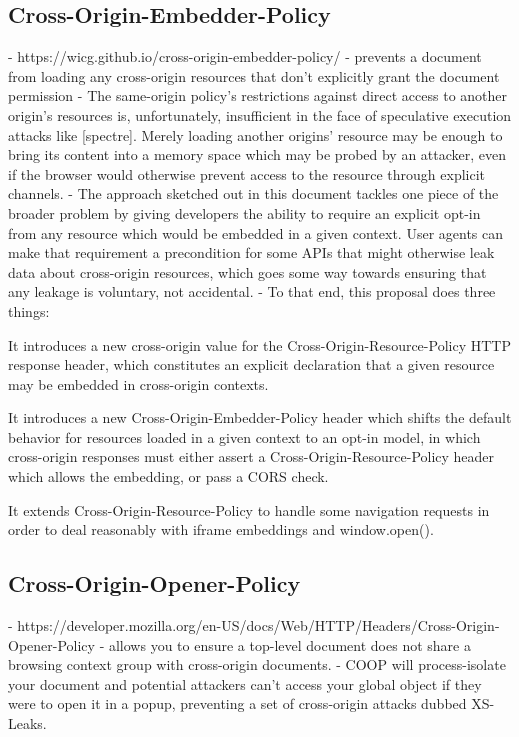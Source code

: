 \documentclass{mscreport}
\begin{document}
\subsection{Cross-Origin-Embedder-Policy}
- https://wicg.github.io/cross-origin-embedder-policy/
- prevents a document from loading any cross-origin resources that don't explicitly grant the document permission
- The same-origin policy’s restrictions against direct access to another origin’s resources is, unfortunately, insufficient in the face of speculative execution attacks like [spectre]. Merely loading another origins' resource may be enough to bring its content into a memory space which may be probed by an attacker, even if the browser would otherwise prevent access to the resource through explicit channels.
- The approach sketched out in this document tackles one piece of the broader problem by giving developers the ability to require an explicit opt-in from any resource which would be embedded in a given context. User agents can make that requirement a precondition for some APIs that might otherwise leak data about cross-origin resources, which goes some way towards ensuring that any leakage is voluntary, not accidental.
- To that end, this proposal does three things:

It introduces a new cross-origin value for the Cross-Origin-Resource-Policy HTTP response header, which constitutes an explicit declaration that a given resource may be embedded in cross-origin contexts.

It introduces a new Cross-Origin-Embedder-Policy header which shifts the default behavior for resources loaded in a given context to an opt-in model, in which cross-origin responses must either assert a Cross-Origin-Resource-Policy header which allows the embedding, or pass a CORS check.

It extends Cross-Origin-Resource-Policy to handle some navigation requests in order to deal reasonably with iframe embeddings and window.open().

\subsection{Cross-Origin-Opener-Policy}
- https://developer.mozilla.org/en-US/docs/Web/HTTP/Headers/Cross-Origin-Opener-Policy
- allows you to ensure a top-level document does not share a browsing context group with cross-origin documents.
- COOP will process-isolate your document and potential attackers can't access your global object if they were to open it in a popup, preventing a set of cross-origin attacks dubbed XS-Leaks.
\end{document}
